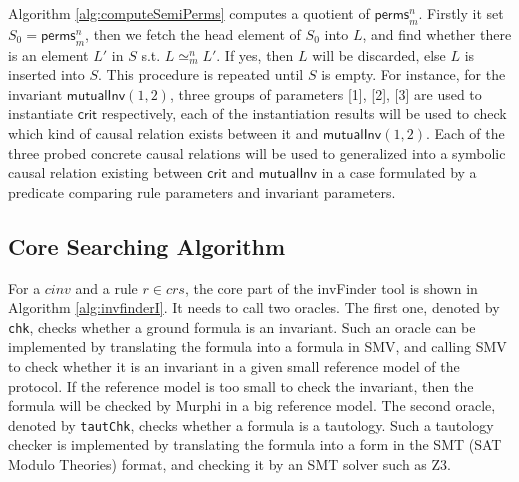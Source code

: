 \documentclass[final]{IEEEtran}
\begin{document}
Algorithm \ref{alg:computeSemiPerms} computes a quotient of $\mathsf{perms}_{m}^{n}$.   Firstly it set $S_0=\mathsf{perms}_m^n$,  then we fetch the head element of $S_0$ into $L$, and find whether there is an element $L'$ in $S$ s.t. $L\simeq_m^n L'$. If  yes, then $L$ will be discarded, else $L$ is inserted into $S$. This procedure is repeated until $S$ is empty.
For instance, for the invariant $\mathsf{mutualInv}(1,2)$, three groups of parameters [1], [2], [3] are used to instantiate $\mathsf{crit}$ respectively, each of the instantiation results will be used to check which kind of  causal relation exists between it and $\mathsf{mutualInv}(1,2)$.  Each of the three probed concrete causal relations will be used to generalized  into a symbolic causal relation existing between $\mathsf{crit}$ and $\mathsf{mutualInv}$ in a case formulated by a predicate comparing rule parameters and invariant parameters.  %

\subsection{Core Searching Algorithm}\label{sec:coresearchingAlgorithm}

For a  $cinv$ and a rule $r \in crs$, the core part of the {\sf invFinder} tool is shown in Algorithm \ref{alg:invfinderI}. It needs to call two oracles. The first one, denoted by {\tt chk}, checks whether a ground formula is an invariant. Such an oracle can be implemented by translating the formula into a formula in SMV, and calling SMV to check whether it is an invariant  in a given small reference model of the protocol. If  the reference model is too small to check the invariant, then the formula will be checked by Murphi in a big reference model.  The second oracle, denoted by {\tt tautChk}, checks whether a formula is a tautology. Such a tautology checker is implemented by translating the formula into a form in the SMT (SAT Modulo Theories) format, and checking it by an SMT solver such as Z3.
\end{document}

